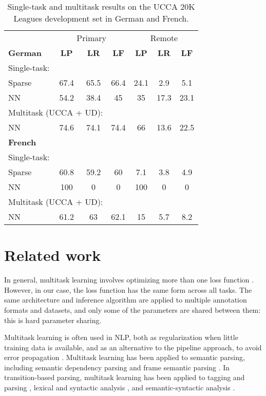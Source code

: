 \documentclass[11pt,a4paper]{article}
\begin{document}
\begin{table}
\begin{tabular}{lccc|ccc}
& \multicolumn{3}{c|}{Primary} & \multicolumn{3}{c}{Remote} \\
\textbf{German} & \textbf{LP} & \textbf{LR} & \textbf{LF} & \textbf{LP} & \textbf{LR} & \textbf{LF} \\
\multicolumn{3}{l}{Single-task:} \\
\small Sparse & 67.4 & 65.5 & 66.4 & 24.1 & 2.9 & 5.1 \\
\small NN & 54.2 & 38.4 & 45 & 35 & 17.3 & 23.1 \\
\multicolumn{3}{l}{Multitask (UCCA + UD):} \\
\small NN & 74.6 & 74.1 & 74.4 & 66 & 13.6 & 22.5 \\
\hline
\textbf{French} \\
\multicolumn{3}{l}{Single-task:} \\
\small Sparse & 60.8 & 59.2 & 60 & 7.1 & 3.8 & 4.9 \\
\small NN & 100 & 0 & 0 & 100 & 0 & 0 \\
\multicolumn{3}{l}{Multitask (UCCA + UD):} \\
\small NN & 61.2 & 63 & 62.1 & 15 & 5.7 & 8.2
\end{tabular}
\caption{Single-task and multitask results on the UCCA 20K Leagues development set in German and French.\label{tab:multilingual}}
\end{table}



\section{Related work}\label{sec:related_work}

In general, multitask learning involves optimizing more than one loss function \cite{ruder2017overview}.
However, in our case, the loss function has the same form across all tasks.
The same architecture and inference algorithm are applied to multiple annotation formats and datasets,
and only some of the parameters are shared between them: this is hard parameter sharing.

Multitask learning is often used in NLP, both as regularization when little training data is available,
and as an alternative to the pipeline approach, to avoid error propagation
\cite{collobert2008unified}.
Multitask learning has been applied to semantic parsing, including
semantic dependency parsing \cite{P17-1186} and
frame semantic parsing \cite{swayamdipta2017frame}.
In transition-based parsing, multitask learning has been applied to
tagging and parsing \cite{bohnet2012transition,Zhang2016StackpropagationIR},
lexical and syntactic analysis \cite{constant-nivre:2016:P16-1,more2016joint},
and semantic-syntactic analysis \cite{swayamdipta-EtAl:2016:CoNLL,henderson2013multilingual}.
\end{document}
